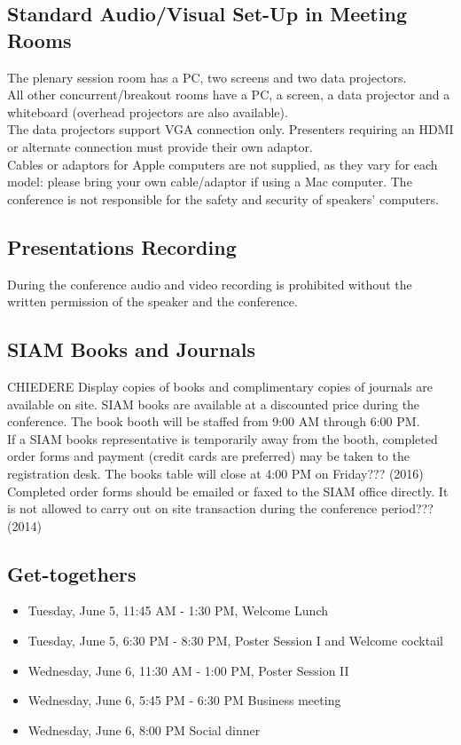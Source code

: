 \begin{multicols}{2}
\subsection*{Standard Audio/Visual Set-Up in Meeting Rooms}
The plenary session room has a PC, two screens and two data projectors.\\ 
All other concurrent/breakout rooms have a PC, a screen, a data projector and a whiteboard (overhead projectors are also available).\\
The data projectors support VGA connection only. Presenters requiring an HDMI or alternate connection must provide their own adaptor.\\
Cables or adaptors for Apple computers are not supplied, as they vary for each model: please bring your own cable/adaptor if using a Mac computer. 
The conference is not responsible for the safety and security of speakers' computers.\\
\subsection*{Presentations Recording}
During the conference audio and video recording is prohibited without the written permission of the speaker and the conference.
\subsection*{SIAM Books and Journals}CHIEDERE
Display copies of books and complimentary copies of journals are available on site. SIAM books are available at a discounted price during the conference. The book booth will be staffed from 9:00 AM through 6:00 PM. \\If a SIAM books representative is temporarily away from the booth, completed order forms and payment (credit cards are preferred) may be taken to the registration desk. The books table will close at 4:00 PM on Friday??? (2016)\\
Completed order forms should be emailed or faxed to the SIAM office directly. It is not allowed to carry out on site transaction during the conference period??? (2014)
\subsection*{Get-togethers}
\begin{itemize}
\item Tuesday, June 5, 11:45 AM - 1:30 PM, Welcome Lunch
\item Tuesday, June 5, 6:30 PM - 8:30 PM, Poster Session I and Welcome cocktail
\item Wednesday, June 6, 11:30 AM - 1:00 PM, Poster Session II
\item Wednesday, June 6, 5:45 PM - 6:30 PM Business meeting
\item Wednesday, June 6, 8:00 PM Social dinner
\end{itemize}

\end{multicols}

